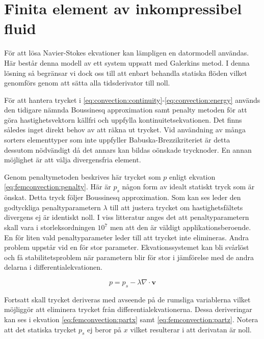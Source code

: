 \section{Finita element av inkompressibel fluid}

För att lösa Navier-Stokes ekvationer kan lämpligen en datormodell användas.
Här består denna modell av ett system uppsatt med Galerkins metod.
I denna lösning så begränsar vi dock oss till att enbart behandla statiska flöden
vilket genomförs genom att sätta alla tidsderivator till noll.

För att hantera trycket i \eqref{eq:convection:continuity}-\eqref{eq:convection:energy} används den tidigare nämnda Boussinesq approximation
samt penalty metoden för att göra hastighetsvektorn källfri och uppfylla
kontinuitetsekvationen. Det finns således inget direkt behov av att räkna ut trycket.
Vid användning av många sorters elementtyper som inte uppfyller Babuska-Brezzikriteriet
är detta dessutom nödvändigt då det annars kan bildas oönskade trycknoder. 
En annan möjlighet är att välja divergensfria element. \cite{babuska1973}\cite{segal2011}

Genom penaltymetoden beskrives här trycket som $p$ enligt ekvation
\eqref{eq:femconvection:penalty}. Här är $p_s$ någon form av idealt statiskt
tryck som är önskat. Detta tryck följer Boussinesq approximation.
\cite{heinrich88}\cite{taylor79}
Som kan ses leder den godtyckliga penaltyparametern $\lambda$ till att justera trycket
om hastighetsfältets divergens ej är identiskt noll. I viss litteratur anges 
det att penaltyparametern skall vara i storleksordningen $10^7$ men att den
är väldigt applikationsberoende. En för liten vald penaltyparameter leder till att
trycket inte elimineras. Andra problem uppstår vid en för stor parameter. Ekvationssystemet
kan bli svårlöst och få stabilitetsproblem när parametern blir
för stor i jämförelse med de andra delarna i differentialekvationen.\cite{reddy93}\cite{roy05}\cite{basak04}\cite{segal2011}

\begin{equation}
\label{eq:femconvection:penalty}
p = p_s - \lambda\nabla\cdot\mathbf{v}
\end{equation}

\noindent
Fortsatt skall trycket deriveras med avseende på de rumsliga variablerna vilket möjliggör
att eliminera trycket från differentialekvationerna. Dessa deriveringar kan ses i ekvation
\eqref{eq:femconvection:partx} samt \eqref{eq:femconvection:partz}.
Notera att det statiska trycket
$p_s$ ej beror på $x$ vilket resulterar i att derivatan är noll.

